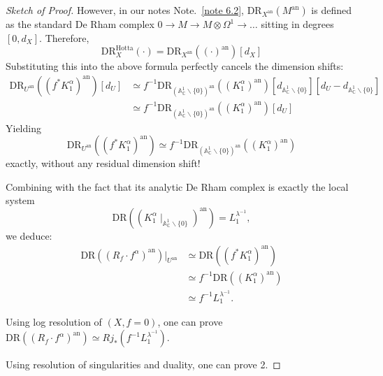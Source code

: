 \begin{proof}[Sketch of Proof]
    However, in our notes Note.~\ref{note 6.2},
    $\mathrm{DR}_{X^{\mathrm{an}}}(M^\mathrm{an})$ is defined as the standard De Rham complex $0 \to M \to M \otimes \Omega^1 \to \dots $ sitting in degrees $[0, d_X]$.
    Therefore,
    \[
        \mathrm{DR}^{\mathrm{Hotta}}_X(\cdot) = \mathrm{DR}_{X^\mathrm{an}}((\cdot)^\mathrm{an})[d_X]
    \]
    Substituting this into the above formula perfectly cancels the dimension shifts:
    \begin{align*}
        \mathrm{DR}_{U^\mathrm{an}}((f^* K_1^\alpha)^\mathrm{an})[d_U] & \simeq f^{-1} \mathrm{DR}_{(\mathbb{A}^1_{\mathbb{C}}\backslash\{0\})^\mathrm{an}}((K_1^\alpha)^\mathrm{an})[d_{\mathbb{A}^1_{\mathbb{C}}\backslash\{0\}}] [d_U - d_{\mathbb{A}^1_{\mathbb{C}}\backslash\{0\}}] \\
                                                                       & \simeq f^{-1} \mathrm{DR}_{(\mathbb{A}^1_{\mathbb{C}}\backslash\{0\})^\mathrm{an}}((K_1^\alpha)^\mathrm{an})[d_U]
    \end{align*}
    Yielding
    \[
        \mathrm{DR}_{U^\mathrm{an}}((f^* K_1^\alpha)^\mathrm{an}) \simeq f^{-1} \mathrm{DR}_{(\mathbb{A}^1_{\mathbb{C}}\backslash\{0\})^\mathrm{an}}((K_1^\alpha)^\mathrm{an})
    \]
    exactly, without any residual dimension shift!

    Combining with the fact that its analytic De Rham complex is exactly the local system
    \[
        \mathrm{DR}\left((K_1^\alpha\mid_{\mathbb{A}^1_{\mathbb{C}}\backslash\{0\}})^{\mathrm{an}}\right) = L_1^{\lambda^{-1}},
    \]
    we deduce:
    \begin{align*}
        \mathrm{DR}((R_f \cdot f^\alpha)^{\mathrm{an}})|_{U^{\mathrm{an}}} & \simeq \mathrm{DR}( (f^* K_1^\alpha)^{\mathrm{an}} )  \\
                                                                           & \simeq f^{-1} \mathrm{DR}((K_1^\alpha)^{\mathrm{an}}) \\
                                                                           & \simeq f^{-1} L_1^{\lambda^{-1}}.
    \end{align*}


    \medskip

    Using log resolution of $(X,f=0)$, one can prove $\mathrm{DR}((R_f \cdot f^\alpha)^{\mathrm{an}}) \simeq R j_*(f^{-1} L_1^{\lambda^{-1}})$.

    \medskip

    Using resolution of singularities and duality, one can prove 2.
\end{proof}
